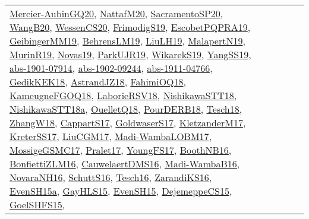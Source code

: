 {\begin{longtable}{lp{3cm}>{\raggedright}p{6cm}>{\raggedright}p{6cm}p{8cm}}
\href{papers/Mercier-AubinGQ20.pdf}{Mercier-AubinGQ20}\cite{Mercier-AubinGQ20}, \href{papers/NattafM20.pdf}{NattafM20}\cite{NattafM20}, \href{articles/SacramentoSP20.pdf}{SacramentoSP20}\cite{SacramentoSP20}, \href{papers/WangB20.pdf}{WangB20}\cite{WangB20}, \href{papers/WessenCS20.pdf}{WessenCS20}\cite{WessenCS20}, \href{papers/FrimodigS19.pdf}{FrimodigS19}\cite{FrimodigS19}, \href{articles/EscobetPQPRA19.pdf}{EscobetPQPRA19}\cite{EscobetPQPRA19}, \href{papers/GeibingerMM19.pdf}{GeibingerMM19}\cite{GeibingerMM19}, \href{papers/BehrensLM19.pdf}{BehrensLM19}\cite{BehrensLM19}, \href{papers/LiuLH19.pdf}{LiuLH19}\cite{LiuLH19}, \href{papers/MalapertN19.pdf}{MalapertN19}\cite{MalapertN19}, \href{papers/MurinR19.pdf}{MurinR19}\cite{MurinR19}, \href{articles/Novas19.pdf}{Novas19}\cite{Novas19}, \href{papers/ParkUJR19.pdf}{ParkUJR19}\cite{ParkUJR19}, \href{articles/WikarekS19.pdf}{WikarekS19}\cite{WikarekS19}, \href{papers/YangSS19.pdf}{YangSS19}\cite{YangSS19}, \href{articles/abs-1901-07914.pdf}{abs-1901-07914}\cite{abs-1901-07914}, \href{articles/abs-1902-09244.pdf}{abs-1902-09244}\cite{abs-1902-09244}, \href{articles/abs-1911-04766.pdf}{abs-1911-04766}\cite{abs-1911-04766}, \href{articles/GedikKEK18.pdf}{GedikKEK18}\cite{GedikKEK18}, \href{papers/AstrandJZ18.pdf}{AstrandJZ18}\cite{AstrandJZ18}, \href{articles/FahimiOQ18.pdf}{FahimiOQ18}\cite{FahimiOQ18}, \href{papers/KameugneFGOQ18.pdf}{KameugneFGOQ18}\cite{KameugneFGOQ18}, \href{articles/LaborieRSV18.pdf}{LaborieRSV18}\cite{LaborieRSV18}, \href{papers/NishikawaSTT18.pdf}{NishikawaSTT18}\cite{NishikawaSTT18}, \href{papers/NishikawaSTT18a.pdf}{NishikawaSTT18a}\cite{NishikawaSTT18a}, \href{papers/OuelletQ18.pdf}{OuelletQ18}\cite{OuelletQ18}, \href{articles/PourDERB18.pdf}{PourDERB18}\cite{PourDERB18}, \href{papers/Tesch18.pdf}{Tesch18}\cite{Tesch18}, \href{articles/ZhangW18.pdf}{ZhangW18}\cite{ZhangW18}, \href{papers/CappartS17.pdf}{CappartS17}\cite{CappartS17}, \href{papers/GoldwaserS17.pdf}{GoldwaserS17}\cite{GoldwaserS17}, \href{papers/KletzanderM17.pdf}{KletzanderM17}\cite{KletzanderM17}, \href{articles/KreterSS17.pdf}{KreterSS17}\cite{KreterSS17}, \href{papers/LiuCGM17.pdf}{LiuCGM17}\cite{LiuCGM17}, \href{papers/Madi-WambaLOBM17.pdf}{Madi-WambaLOBM17}\cite{Madi-WambaLOBM17}, \href{papers/MossigeGSMC17.pdf}{MossigeGSMC17}\cite{MossigeGSMC17}, \href{papers/Pralet17.pdf}{Pralet17}\cite{Pralet17}, \href{papers/YoungFS17.pdf}{YoungFS17}\cite{YoungFS17}, \href{papers/BoothNB16.pdf}{BoothNB16}\cite{BoothNB16}, \href{papers/BonfiettiZLM16.pdf}{BonfiettiZLM16}\cite{BonfiettiZLM16}, \href{papers/CauwelaertDMS16.pdf}{CauwelaertDMS16}\cite{CauwelaertDMS16}, \href{papers/Madi-WambaB16.pdf}{Madi-WambaB16}\cite{Madi-WambaB16}, \href{articles/NovaraNH16.pdf}{NovaraNH16}\cite{NovaraNH16}, \href{papers/SchuttS16.pdf}{SchuttS16}\cite{SchuttS16}, \href{papers/Tesch16.pdf}{Tesch16}\cite{Tesch16}, \href{articles/ZarandiKS16.pdf}{ZarandiKS16}\cite{ZarandiKS16}, \href{articles/EvenSH15a.pdf}{EvenSH15a}\cite{EvenSH15a}, \href{papers/GayHLS15.pdf}{GayHLS15}\cite{GayHLS15}, \href{papers/EvenSH15.pdf}{EvenSH15}\cite{EvenSH15}, \href{papers/DejemeppeCS15.pdf}{DejemeppeCS15}\cite{DejemeppeCS15}, \href{articles/GoelSHFS15.pdf}{GoelSHFS15}\cite{GoelSHFS15}, 
\end{longtable}}
